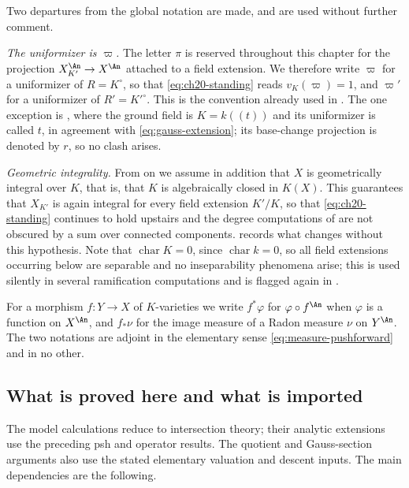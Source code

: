 Two departures from the global notation are made, and are used without
further comment.

\emph{The uniformizer is $\varpi$.}  The letter $\pi$ is reserved
throughout this chapter for the projection $X_{K'}^{\An}\to X^{\An}$
attached to a field extension.  We therefore write $\varpi$ for a
uniformizer of $R=K^\circ$, so that \eqref{eq:ch20-standing} reads
$v_K(\varpi)=1$, and $\varpi'$ for a uniformizer of $R'=K'^\circ$.
This is the convention already used in
.  The one
exception is , where the ground field is
$K=k(\!(t)\!)$ and its uniformizer is called $t$, in agreement with
\eqref{eq:gauss-extension}; its base-change projection is denoted by $r$, so no clash arises.

\emph{Geometric integrality.}  From  on we assume
in addition that $X$ is geometrically integral over $K$, that is, that
$K$ is algebraically closed in $K(X)$.  This guarantees that $X_{K'}$
is again integral for every field extension $K'/K$, so that
\eqref{eq:ch20-standing} continues to hold upstairs and the degree
computations of  are not obscured by a sum over
connected components.   records
what changes without this hypothesis.  Note that $\operatorname{char}K=0$,
since $\operatorname{char}k=0$, so all field extensions occurring below are
separable and no inseparability phenomena arise; this is used silently in
several ramification computations and is flagged again in
.

For a morphism $f:Y\to X$ of $K$-varieties we write $f^*\varphi$ for
$\varphi\circ f^{\An}$ when $\varphi$ is a function on $X^{\An}$, and
$f_*\nu$ for the image measure of a Radon measure $\nu$ on $Y^{\An}$.
The two notations are adjoint in the elementary sense
\eqref{eq:measure-pushforward} and in no other.

\subsection{What is proved here and what is imported}
\label{sec:ch30-imported}

The model calculations reduce to intersection theory; their analytic
extensions use the preceding psh and operator results.  The quotient and
Gauss-section arguments also use the stated elementary valuation and
descent inputs.  The main dependencies are the following.

